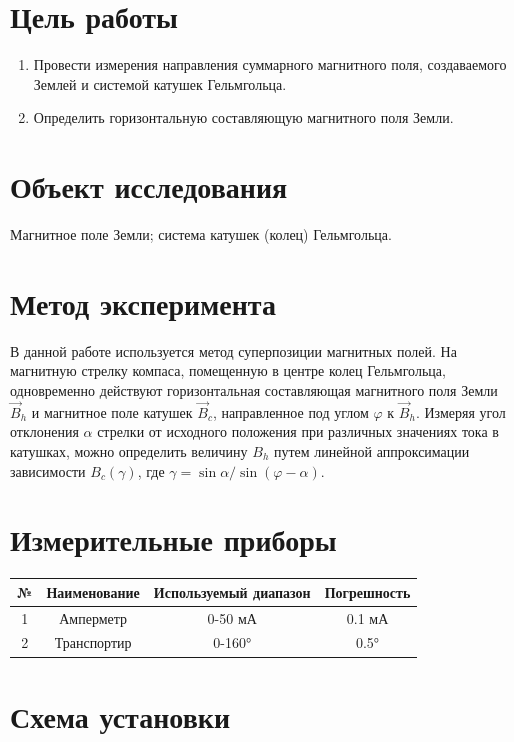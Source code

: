 \section{Цель работы}

\begin{enumerate}
    \item Провести измерения направления суммарного магнитного поля, создаваемого Землей и системой катушек Гельмгольца.
    \item Определить горизонтальную составляющую магнитного поля Земли.
\end{enumerate}

\section{Объект исследования}

Магнитное поле Земли; система катушек (колец) Гельмгольца.

\section{Метод эксперимента}

В данной работе используется метод суперпозиции магнитных полей. На магнитную стрелку компаса, помещенную в центре колец Гельмгольца, одновременно действуют горизонтальная составляющая магнитного поля Земли $\vec{B}_h$ и магнитное поле катушек $\vec{B}_c$, направленное под углом $\varphi$ к $\vec{B}_h$. Измеряя угол отклонения $\alpha$ стрелки от исходного положения при различных значениях тока в катушках, можно определить величину $B_h$ путем линейной аппроксимации зависимости $B_c(\gamma)$, где $\gamma = \sin\alpha / \sin(\varphi - \alpha)$.

\section{Измерительные приборы}

\begin{table}[h]
\centering
\begin{tabular}{|c|c|c|c|}
\hline
№ & Наименование & Используемый диапазон & Погрешность \\
\hline
1 & Амперметр & 0-50 мА & 0.1 мА \\
\hline
2 & Транспортир & 0-160° & 0.5° \\
\hline
\end{tabular}
\end{table}

\section{Схема установки}

